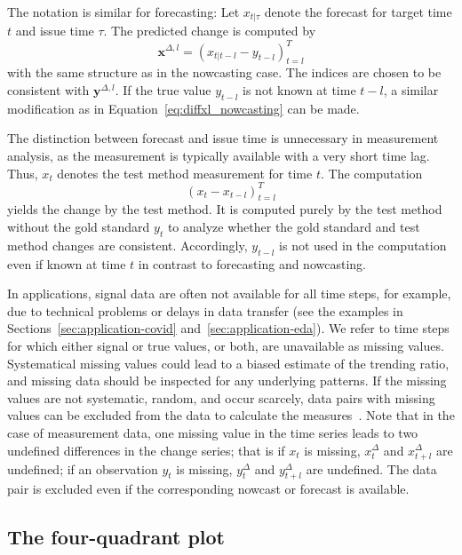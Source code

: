 \documentclass[pdflatex]{sn-jnl}
\theoremstyle{plain}%
\theoremstyle{definition}
\newcommand{\diffxl}{\mathbf{x}^{\Delta,l}}
\newcommand{\diffyl}{\mathbf{y}^{\Delta,l}}
\newcommand{\diffxt}[1][t]{x^{\Delta}_{#1}}
\newcommand{\diffyt}[1][t]{y^{\Delta}_{#1}}
\begin{document}
The notation is similar for forecasting: Let $x_{t | \tau}$ denote the forecast for target time $t$ and issue time $\tau$.
The predicted change is computed by
\begin{equation} \diffxl = (x_{t|t-l} - y_{t-l})^T_{t=l}\label{eq:diffxl_forecasting}
\end{equation}
with the same structure as in the nowcasting case.
The indices are chosen to be consistent with $\diffyl$.
If the true value $y_{t-l}$ is not known at time $t-l$, a similar modification as in Equation~\eqref{eq:diffxl_nowcasting} can be made.


The distinction between forecast and issue time is unnecessary in measurement analysis, as the measurement is typically available with a very short time lag.
Thus, $x_t$ denotes the test method measurement for time $t$.
The computation
\begin{equation}
  (x_{t} - x_{t-l})_{t=l}^T \label{eq:diffxl_measure}
\end{equation}
yields the change by the test method.
It is computed purely by the test method without the gold standard $y_t$ to analyze whether the gold standard and test method changes are consistent.
Accordingly, $y_{t-l}$ is not used in the computation even if known at time $t$ in contrast to forecasting and nowcasting.

In applications, signal data are often not available for all time steps, for example, due to technical problems or delays in data transfer (see the examples in Sections~\ref{sec:application-covid} and~\ref{sec:application-eda}).
We refer to time steps for which either signal or true values, or both, are unavailable as missing values.
Systematical missing values could lead to a biased estimate of the trending ratio, and missing data should be inspected for any underlying patterns.
If the missing values are not systematic, random, and occur scarcely, data pairs with missing values can be excluded from the data to calculate the measures~\parencite[see][Section 1.3]{VanBuuren2018}.
Note that in the case of measurement data, one missing value in the time series leads to two undefined differences in the change series; that is if $x_t$ is missing, $\diffxt$ and $\diffxt[t+l]$ are undefined; if an observation $y_t$ is missing, $\diffyt$ and $\diffyt[t+l]$ are undefined.
The data pair is excluded even if the corresponding nowcast or forecast is available.



\subsection{The four-quadrant plot}\label{subsec:aatc-four-quadrant-plot}
\end{document}
